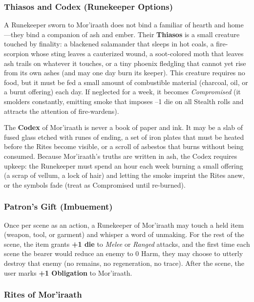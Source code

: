 \subsubsection*{Thiasos and Codex (Runekeeper Options)}

A Runekeeper sworn to Mor'iraath does not bind a familiar of hearth and home---they bind a companion of ash and ember. Their \textbf{Thiasos} is a small creature touched by finality: a blackened salamander that sleeps in hot coals, a fire-scorpion whose sting leaves a cauterized wound, a soot-colored moth that leaves ash trails on whatever it touches, or a tiny phoenix fledgling that cannot yet rise from its own ashes (and may one day burn its keeper). This creature requires no food, but it must be fed a small amount of combustible material (charcoal, oil, or a burnt offering) each day. If neglected for a week, it becomes \textit{Compromised} (it smolders constantly, emitting smoke that imposes --1 die on all Stealth rolls and attracts the attention of fire-wardens).

The \textbf{Codex} of Mor'iraath is never a book of paper and ink. It may be a slab of fused glass etched with runes of ending, a set of iron plates that must be heated before the Rites become visible, or a scroll of asbestos that burns without being consumed. Because Mor'iraath's truths are written in ash, the Codex requires upkeep: the Runekeeper must spend an hour each week burning a small offering (a scrap of vellum, a lock of hair) and letting the smoke imprint the Rites anew, or the symbols fade (treat as Compromised until re-burned).

\subsubsection*{Patron's Gift (Imbuement)}

Once per scene as an action, a Runekeeper of Mor'iraath may touch a held item (weapon, tool, or garment) and whisper a word of unmaking. For the rest of the scene, the item grants \textbf{+1 die} to \textit{Melee} or \textit{Ranged} attacks, and the first time each scene the bearer would reduce an enemy to 0 Harm, they may choose to utterly destroy that enemy (no remains, no regeneration, no trace). After the scene, the user marks \textbf{+1 Obligation} to Mor'iraath.

\subsubsection*{Rites of Mor'iraath}

